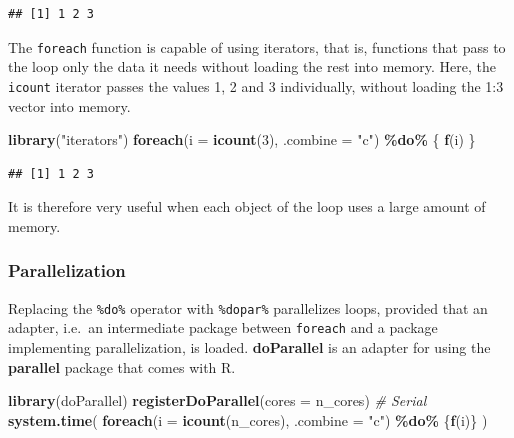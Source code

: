 \documentclass[
  12pt,
  american,
  a4paper,
  extrafontsizes,onecolumn,openright
  ]{memoir}
\newenvironment{Shaded}{\begin{snugshade}}{\end{snugshade}}
\newcommand{\AttributeTok}[1]{\textcolor[rgb]{0.13,0.29,0.53}{#1}}
\newcommand{\CommentTok}[1]{\textcolor[rgb]{0.56,0.35,0.01}{\textit{#1}}}
\newcommand{\DecValTok}[1]{\textcolor[rgb]{0.00,0.00,0.81}{#1}}
\newcommand{\FunctionTok}[1]{\textcolor[rgb]{0.13,0.29,0.53}{\textbf{#1}}}
\newcommand{\NormalTok}[1]{#1}
\newcommand{\SpecialCharTok}[1]{\textcolor[rgb]{0.81,0.36,0.00}{\textbf{#1}}}
\newcommand{\StringTok}[1]{\textcolor[rgb]{0.31,0.60,0.02}{#1}}
\begin{document}
\begin{verbatim}
## [1] 1 2 3
\end{verbatim}

\normalsize

The \texttt{foreach} function is capable of using iterators, that is, functions that pass to the loop only the data it needs without loading the rest into memory.
Here, the \texttt{icount} iterator passes the values 1, 2 and 3 individually, without loading the 1:3 vector into memory.

\scriptsize

\begin{Shaded}
\begin{Highlighting}[]
\FunctionTok{library}\NormalTok{(}\StringTok{"iterators"}\NormalTok{)}
\FunctionTok{foreach}\NormalTok{(}\AttributeTok{i =} \FunctionTok{icount}\NormalTok{(}\DecValTok{3}\NormalTok{), }\AttributeTok{.combine =} \StringTok{"c"}\NormalTok{) }\SpecialCharTok{\%do\%}\NormalTok{ \{}
  \FunctionTok{f}\NormalTok{(i)}
\NormalTok{\}}
\end{Highlighting}
\end{Shaded}

\begin{verbatim}
## [1] 1 2 3
\end{verbatim}

\normalsize

It is therefore very useful when each object of the loop uses a large amount of memory.

\subsubsection{Parallelization}\label{parallelization}

Replacing the \texttt{\%do\%} operator with \texttt{\%dopar\%} parallelizes loops, provided that an adapter, i.e.~an intermediate package between \texttt{foreach} and a package implementing parallelization, is loaded.
\textbf{doParallel} is an adapter for using the \textbf{parallel} package that comes with R.

\scriptsize

\begin{Shaded}
\begin{Highlighting}[]
\FunctionTok{library}\NormalTok{(doParallel)}
\FunctionTok{registerDoParallel}\NormalTok{(}\AttributeTok{cores =}\NormalTok{ n\_cores)}
\CommentTok{\# Serial}
\FunctionTok{system.time}\NormalTok{(}
  \FunctionTok{foreach}\NormalTok{(}\AttributeTok{i =} \FunctionTok{icount}\NormalTok{(n\_cores), }\AttributeTok{.combine =} \StringTok{"c"}\NormalTok{) }\SpecialCharTok{\%do\%}\NormalTok{ \{}\FunctionTok{f}\NormalTok{(i)\}}
\NormalTok{)}
\end{Highlighting}
\end{Shaded}
\end{document}
